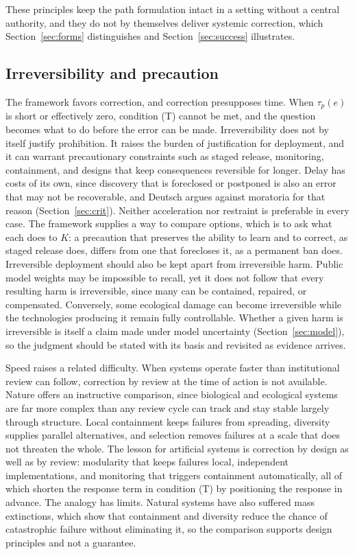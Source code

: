\documentclass[11pt]{article}
\begin{document}
These principles keep the path formulation intact in a setting without a central authority, and they do not by themselves deliver systemic correction, which Section~\ref{sec:forms} distinguishes and Section~\ref{sec:success} illustrates.

\subsection{Irreversibility and precaution}\label{sec:irrev}

The framework favors correction, and correction presupposes time. When $\tau_p(e)$ is short or effectively zero, condition (T) cannot be met, and the question becomes what to do before the error can be made. Irreversibility does not by itself justify prohibition. It raises the burden of justification for deployment, and it can warrant precautionary constraints such as staged release, monitoring, containment, and designs that keep consequences reversible for longer. Delay has costs of its own, since discovery that is foreclosed or postponed is also an error that may not be recoverable, and Deutsch argues against moratoria for that reason (Section~\ref{sec:crit}). Neither acceleration nor restraint is preferable in every case. The framework supplies a way to compare options, which is to ask what each does to $K$: a precaution that preserves the ability to learn and to correct, as staged release does, differs from one that forecloses it, as a permanent ban does. Irreversible deployment should also be kept apart from irreversible harm. Public model weights may be impossible to recall, yet it does not follow that every resulting harm is irreversible, since many can be contained, repaired, or compensated. Conversely, some ecological damage can become irreversible while the technologies producing it remain fully controllable. Whether a given harm is irreversible is itself a claim made under model uncertainty (Section~\ref{sec:model}), so the judgment should be stated with its basis and revisited as evidence arrives.

Speed raises a related difficulty. When systems operate faster than institutional review can follow, correction by review at the time of action is not available. Nature offers an instructive comparison, since biological and ecological systems are far more complex than any review cycle can track and stay stable largely through structure. Local containment keeps failures from spreading, diversity supplies parallel alternatives, and selection removes failures at a scale that does not threaten the whole. The lesson for artificial systems is correction by design as well as by review: modularity that keeps failures local, independent implementations, and monitoring that triggers containment automatically, all of which shorten the response term in condition (T) by positioning the response in advance. The analogy has limits. Natural systems have also suffered mass extinctions, which show that containment and diversity reduce the chance of catastrophic failure without eliminating it, so the comparison supports design principles and not a guarantee.
\end{document}
